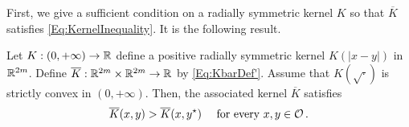 First, we give a sufficient condition on a radially symmetric kernel $K$ so that $\overline{K}$ satisfies \eqref{Eq:KernelInequality}. It is the following result.

\begin{proposition}
\label{Prop:KernelInequalitySufficientCondition} 
Let $K:(0,+\infty) \to \mathbb{R}$ define a positive radially symmetric kernel $K(|x-y|)$ in $\mathbb{R}^{2m}$. Define $\overline{K} : \mathbb{R}^{2m}\times \mathbb{R}^{2m} \to \mathbb{R}$ by \eqref{Eq:KbarDef'}. Assume that $K(\sqrt{\cdot})$ is strictly convex in $(0,+\infty)$. Then, the associated kernel $\overline{K}$ satisfies
	\begin{equation}
	\label{Eq:KernelInequalityBis}
	\overline{K}(x,y) > \overline{K}(x, y^\star) \quad \text{ for every }x,y \in \mathcal{O}\,.
	\end{equation}
\end{proposition}

